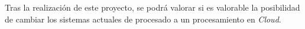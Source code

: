 Tras la realización de este proyecto, se podrá valorar si es valorable la posibilidad de cambiar los sistemas actuales de procesado a un procesamiento en \emph{Cloud}.

